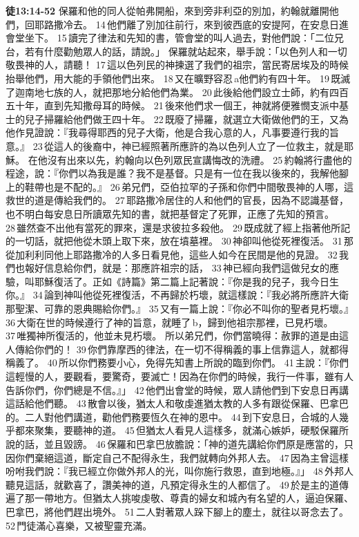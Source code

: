 \textbf{徒13:14-52} 保羅和他的同人從帕弗開船，來到旁非利亞的別加，約翰就離開他們，回耶路撒冷去。 14 他們離了別加往前行，來到彼西底的安提阿，在安息日進會堂坐下。 15 讀完了律法和先知的書，管會堂的叫人過去，對他們說：「二位兄台，若有什麼勸勉眾人的話，請說。」
保羅就站起來，舉手說：「以色列人和一切敬畏神的人，請聽！ 17 這以色列民的神揀選了我們的祖宗，當民寄居埃及的時候抬舉他們，用大能的手領他們出來。 18 又在曠野容忍 a他們約有四十年。 19 既滅了迦南地七族的人，就把那地分給他們為業。 20 此後給他們設立士師，約有四百五十年，直到先知撒母耳的時候。 21 後來他們求一個王，神就將便雅憫支派中基士的兒子掃羅給他們做王四十年。 22 既廢了掃羅，就選立大衛做他們的王，又為他作見證說：『我尋得耶西的兒子大衛，他是合我心意的人，凡事要遵行我的旨意。』 23 從這人的後裔中，神已經照著所應許的為以色列人立了一位救主，就是耶穌。
在他沒有出來以先，約翰向以色列眾民宣講悔改的洗禮。 25 約翰將行盡他的程途，說：『你們以為我是誰？我不是基督。只是有一位在我以後來的，我解他腳上的鞋帶也是不配的。』 26 弟兄們，亞伯拉罕的子孫和你們中間敬畏神的人哪，這救世的道是傳給我們的。 27 耶路撒冷居住的人和他們的官長，因為不認識基督，也不明白每安息日所讀眾先知的書，就把基督定了死罪，正應了先知的預言。 28 雖然查不出他有當死的罪來，還是求彼拉多殺他。 29 既成就了經上指著他所記的一切話，就把他從木頭上取下來，放在墳墓裡。 30 神卻叫他從死裡復活。 31 那從加利利同他上耶路撒冷的人多日看見他，這些人如今在民間是他的見證。 32 我們也報好信息給你們，就是：那應許祖宗的話， 33 神已經向我們這做兒女的應驗，叫耶穌復活了。正如《詩篇》第二篇上記著說：『你是我的兒子，我今日生你。』 34 論到神叫他從死裡復活，不再歸於朽壞，就這樣說：『我必將所應許大衛那聖潔、可靠的恩典賜給你們。』 35 又有一篇上說：『你必不叫你的聖者見朽壞。』 36 大衛在世的時候遵行了神的旨意，就睡了 b，歸到他祖宗那裡，已見朽壞。 37 唯獨神所復活的，他並未見朽壞。
所以弟兄們，你們當曉得：赦罪的道是由這人傳給你們的！ 39 你們靠摩西的律法，在一切不得稱義的事上信靠這人，就都得稱義了。 40 所以你們務要小心，免得先知書上所說的臨到你們。 41 主說：『你們這輕慢的人，要觀看，要驚奇，要滅亡！因為在你們的時候，我行一件事，雖有人告訴你們，你們總是不信。』」
42 他們出會堂的時候，眾人請他們到下安息日再講這話給他們聽。 43 散會以後，猶太人和敬虔進猶太教的人多有跟從保羅、巴拿巴的。二人對他們講道，勸他們務要恆久在神的恩中。
44 到下安息日，合城的人幾乎都來聚集，要聽神的道。 45 但猶太人看見人這樣多，就滿心嫉妒，硬駁保羅所說的話，並且毀謗。 46 保羅和巴拿巴放膽說：「神的道先講給你們原是應當的，只因你們棄絕這道，斷定自己不配得永生，我們就轉向外邦人去。 47 因為主曾這樣吩咐我們說：『我已經立你做外邦人的光，叫你施行救恩，直到地極。』」 48 外邦人聽見這話，就歡喜了，讚美神的道，凡預定得永生的人都信了。 49 於是主的道傳遍了那一帶地方。但猶太人挑唆虔敬、尊貴的婦女和城內有名望的人，逼迫保羅、巴拿巴，將他們趕出境外。 51 二人對著眾人跺下腳上的塵土，就往以哥念去了。 52 門徒滿心喜樂，又被聖靈充滿。\\


